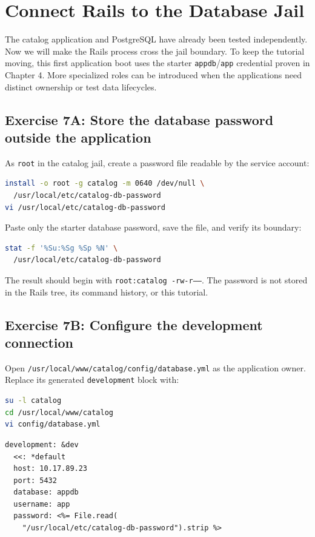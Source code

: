 \chapter{Connect Rails to the Database Jail}

The catalog application and PostgreSQL have already been tested independently.
Now we will make the Rails process cross the jail boundary. To keep the tutorial
moving, this first application boot uses the starter \texttt{appdb}/\texttt{app}
credential proven in Chapter 4. More specialized roles can be introduced when
the applications need distinct ownership or test data lifecycles.

\section{Exercise 7A: Store the database password outside the application}

As \texttt{root} in the catalog jail, create a password file readable by the
service account:

\begin{lstlisting}[language=sh]
install -o root -g catalog -m 0640 /dev/null \
  /usr/local/etc/catalog-db-password
vi /usr/local/etc/catalog-db-password
\end{lstlisting}

Paste only the starter database password, save the file, and verify its
boundary:

\begin{lstlisting}[language=sh]
stat -f '%Su:%Sg %Sp %N' \
  /usr/local/etc/catalog-db-password
\end{lstlisting}

The result should begin with \texttt{root:catalog -rw-r-----}. The password is
not stored in the Rails tree, its command history, or this tutorial.

\section{Exercise 7B: Configure the development connection}

Open \texttt{/usr/local/www/catalog/config/database.yml} as the application
owner. Replace its generated \texttt{development} block with:

\begin{lstlisting}[language=sh]
su -l catalog
cd /usr/local/www/catalog
vi config/database.yml
\end{lstlisting}

\begin{lstlisting}
development: &dev
  <<: *default
  host: 10.17.89.23
  port: 5432
  database: appdb
  username: app
  password: <%= File.read(
    "/usr/local/etc/catalog-db-password").strip %>
\end{lstlisting}

